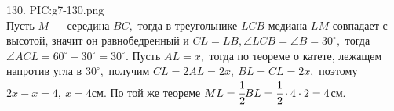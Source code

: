 130. {{PIC:g7-130.png}}\\
Пусть $M$ --- середина $BC,$ тогда в треугольнике $LCB$ медиана $LM$ совпадает с высотой, значит он равнобедренный и  $CL=LB, \angle LCB=\angle B=30^\circ,$ тогда $\angle ACL=60^\circ-30^\circ=30^\circ.$ Пусть $AL=x,$ тогда по теореме о катете, лежащем напротив угла в $30^\circ,$ получим $CL=2AL=2x,\ BL=CL=2x,$ поэтому $2x-x=4,\ x=4$см. По той же теореме $ML=\cfrac{1}{2}BL=\cfrac{1}{2}\cdot4\cdot2=4$см.\\
